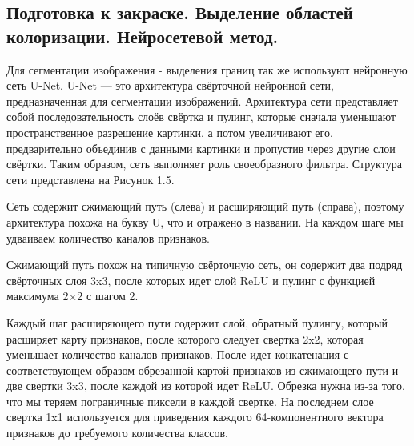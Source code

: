 \subsection{Подготовка к закраске. Выделение областей колоризации. Нейросетевой метод.}

Для сегментации изображения - выделения границ так же используют нейронную сеть U-Net.
U-Net — это архитектура свёрточной нейронной сети, предназначенная для сегментации изображений.
Архитектура сети представляет собой последовательность слоёв свёртка и пулинг, которые сначала уменьшают пространственное разрешение картинки, а потом увеличивают его, предварительно объединив с данными картинки и пропустив через другие слои свёртки. Таким образом, сеть выполняет роль своеобразного фильтра. Структура сети представлена на Рисунок 1.5.

\begin{figure}[ht!]
\end{figure}

Сеть содержит сжимающий путь (слева) и расширяющий путь (справа), поэтому архитектура похожа на букву U, что и отражено в названии. На каждом шаге мы удваиваем количество каналов признаков.

Сжимающий путь похож на типичную свёрточную сеть, он содержит два подряд свёрточных слоя 3x3, после которых идет слой ReLU и пулинг с функцией максимума 2×2 с шагом 2.

Каждый шаг расширяющего пути содержит слой, обратный пулингу, который расширяет карту признаков, после которого следует свертка 2x2, которая уменьшает количество каналов признаков. После идет конкатенация с соответствующем образом обрезанной картой признаков из сжимающего пути и две свертки 3x3, после каждой из которой идет ReLU. Обрезка нужна из-за того, что мы теряем пограничные пиксели в каждой свертке. На последнем слое свертка 1x1 используется для приведения каждого 64-компонентного вектора признаков до требуемого количества классов.

